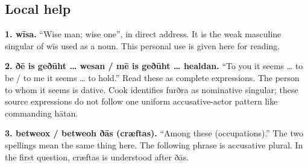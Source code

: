 \par\begin{minipage}{\linewidth}\raggedright




\end{minipage}\par
{}
\subsection*{Local help}

\textbf{1. wīsa.} “Wise man; wise one”, in direct address. It is the weak masculine singular of wīs used as a noun. This personal use is given here for reading.

\textbf{2. ðē is geðūht … wesan /\allowbreak{} mē is geðūht … healdan.} “To you it seems … to be /\allowbreak{} to me it seems … to hold.” Read these as complete expressions. The person to whom it seems is dative. Cook identifies furðra as nominative singular; these source expressions do not follow one uniform accusative-actor pattern like commanding hātan.

\textbf{3. betweox /\allowbreak{} betweoh ðās (cræftas).} “Among these (occupations).” The two spellings mean the same thing here. The following phrase is accusative plural. In the first question, cræftas is understood after ðās.

